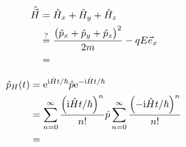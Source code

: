 \begin{align*}
 \hat{\vec H} &= \hat H_x + \hat H_y + \hat H_z\\
 &\overset{?}{=} \frac{\del{\hat p_x + \hat p_y + \hat p_z}^2}{2m} - qE \vec e_x\\
 &=
\end{align*}


\begin{align*}
 \hat p_H (t) &= \ee^{\ii \hat H t /\hbar} \hat p \ee^{-\ii \hat H t / \hbar}\\
 &= \sum_{n=0}^\infty \frac{\del{\ii \hat H t /\hbar}^n}{n!} \hat p \sum_{n=0}^\infty \frac{\del{-\ii \hat H t / \hbar}^n}{n!}\\
 &= 
\end{align*}




